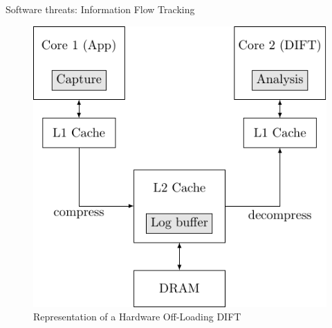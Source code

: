 \begin{frame}{Software threats: Information Flow Tracking}
\begin{minipage}[c]{0.4\textwidth}
{\begin{figure}
                \includegraphics[height=.5\textheight]{src/1_introduction/img/offloading.pdf}
                \caption{Representation of a Hardware Off-Loading DIFT}
                \label{fig:offloading}
            \end{figure}
        }
    \end{minipage}
\end{frame}

